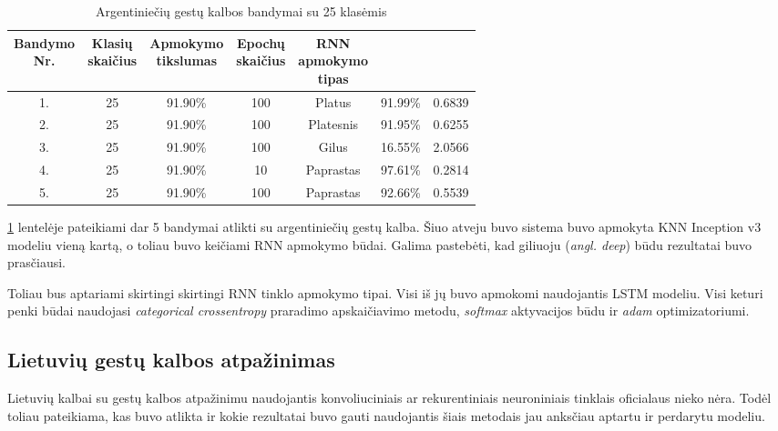 \documentclass{VUMIFPSbakalaurinis}
\begin{document}
\begin{table}[H]\footnotesize
	\centering
	\caption{Argentiniečių gestų kalbos bandymai su 25 klasėmis}
	{\begin{tabular}{| c | c | c | c | c | c | c |} \hline
		\thead{Bandymo\\Nr.} & \thead{Klasių\\skaičius} & \thead{Apmokymo\\tikslumas} & \thead{Epochų\\skaičius} & \thead{RNN\\apmokymo\\tipas} & \thead{Tikslumas} & \thead{Praradimas}  \\
		\hline
		1. & 25 & 91.90\% & 100 & Platus & 91.99\% & 0.6839 \\
		\hline
		2. & 25 & 91.90\% & 100 & Platesnis & 91.95\% & 0.6255 \\
		\hline
		3. & 25 & 91.90\% & 100 & Gilus & 16.55\% & 2.0566 \\
		\hline
		4. & 25 & 91.90\% & 10 & Paprastas & 97.61\% & 0.2814 \\
		\hline
		5. & 25 & 91.90\% & 100 & Paprastas & 92.66\% & 0.5539 \\
		\hline
	\end{tabular}}
	\label{tab:asl-bandymai2}
\end{table}

\ref{tab:asl-bandymai2} lentelėje pateikiami dar 5 bandymai atlikti su argentiniečių gestų kalba. Šiuo atveju buvo sistema buvo apmokyta KNN Inception v3 modeliu vieną kartą, o toliau buvo keičiami RNN apmokymo būdai. Galima pastebėti, kad giliuoju (\textit{angl. deep}) būdu rezultatai buvo prasčiausi. 

Toliau bus aptariami skirtingi skirtingi RNN tinklo apmokymo tipai. Visi iš jų buvo apmokomi naudojantis LSTM modeliu. Visi keturi penki būdai naudojasi \textit{categorical crossentropy} praradimo apskaičiavimo metodu, \textit{softmax} aktyvacijos būdu ir \textit{adam} optimizatoriumi.


\subsection{Lietuvių gestų kalbos atpažinimas}

Lietuvių kalbai su gestų kalbos atpažinimu naudojantis konvoliuciniais ar rekurentiniais neuroniniais tinklais oficialaus nieko nėra. Todėl toliau pateikiama, kas buvo atlikta ir kokie rezultatai buvo gauti naudojantis šiais metodais jau anksčiau aptartu ir perdarytu modeliu. 
\end{document}
